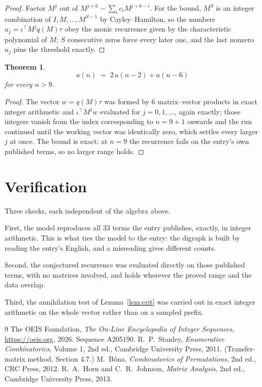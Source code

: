 \documentclass[11pt,a4paper]{article}
\theoremstyle{plain}
\newtheorem{theorem}{Theorem}
\theoremstyle{definition}
\begin{document}
\begin{proof}
Factor $M^{j}$ out of $M^{j+6}-\sum_ic_iM^{j+6-i}$. For the bound, $M^{S}$
is an integer combination of $I,M,\dots,M^{S-1}$ by Cayley--Hamilton, so the numbers
$u_j=\iota^{\!\top}M^{j}q(M)\tau$ obey the monic recurrence given by the characteristic
polynomial of $M$; $S$ consecutive zeros force every later one, and the last nonzero $u_j$
pins the threshold exactly.
\end{proof}

\begin{theorem}
\[
a(n)\;=\;2\,a(n-2) + a(n-6)
\]
for every $n>9$.
\end{theorem}

\begin{proof}
The vector $w=q(M)\tau$ was formed by $6$ matrix--vector products in exact integer
arithmetic and $\iota^{\!\top}M^{j}w$ evaluated for $j=0,1,\dots$, again exactly; those
integers vanish from the index corresponding to $n=9+1$ onwards and the run continued
until the working vector was identically zero, which settles every larger $j$ at once. The bound is exact: at $n=9$ the recurrence fails on the entry's own published terms, so no larger range holds.
\end{proof}

\section{Verification}

Three checks, each independent of the algebra above.

First, the model reproduces all $33$ terms the entry publishes, exactly, in integer
arithmetic. This is what ties the model to the entry: the digraph is built by reading the
entry's English, and a misreading gives different counts.

Second, the conjectured recurrence was evaluated directly on those published terms, with no
matrices involved, and holds wherever the proved range and the data overlap.

Third, the annihilation test of Lemma~\ref{lem:crit} was carried out in exact integer
arithmetic on the whole vector rather than on a sampled prefix.

\begin{thebibliography}{9}
 The OEIS Foundation, \emph{The On-Line Encyclopedia of Integer
Sequences}, \url{https://oeis.org}, 2026. Sequence A205190.
 R.~P.~Stanley, \emph{Enumerative Combinatorics}, Volume 1, 2nd ed.,
Cambridge University Press, 2011. (Transfer-matrix method, Section 4.7.)
 M.~B\'ona, \emph{Combinatorics of Permutations}, 2nd ed., CRC
Press, 2012.
 R.~A.~Horn and C.~R.~Johnson, \emph{Matrix Analysis}, 2nd ed., Cambridge
University Press, 2013.
\end{thebibliography}
\end{document}
